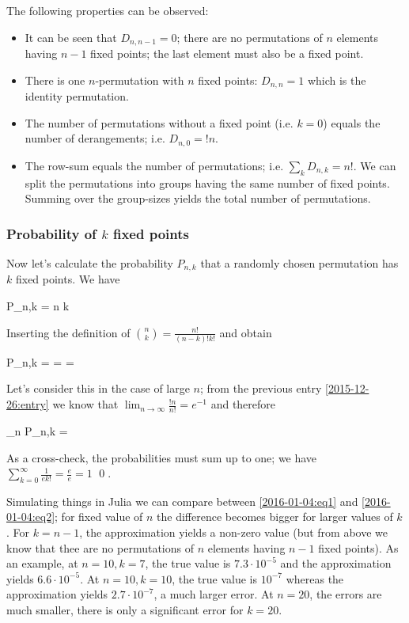 The following properties can be observed:

\begin{itemize}
\item  It can be seen that $D_{n,n-1} = 0$; there are no permutations of $n$ elements having $n-1$ fixed points; the last element must also be a fixed point.
\item  There is one $n$-permutation with $n$ fixed points: $D_{n,n} = 1$ which is the identity permutation.
\item  The number of permutations without a fixed point (i.e. $k=0$) equals the number of derangements; i.e. $D_{n,0} = !n$.
\item  The row-sum equals the number of permutations; i.e. $\sum_{k} D_{n,k} = n!$. We can split the permutations into groups having the same number of fixed points. Summing over the group-sizes yields the total number of permutations.
\end{itemize}

\subsubsection{Probability of $k$ fixed points}

Now let's calculate the probability $P_{n,k}$ that a randomly chosen permutation has $k$ fixed points. We have

\bee
P_{n,k} = {n \choose k} 
\eee

Inserting the definition of ${n \choose k} = \frac{n!}{(n-k)! k!}$ and obtain

\be\label{2016-01-04:eq1}
P_{n,k} =   =  =  
\ee

Let's consider this in the case of large $n$; from the previous entry \ref{2015-12-26:entry} we know that $\lim_{n \rightarrow \infty} \frac{!n}{n!} = e^{-1}$ and therefore

\be\label{2016-01-04:eq2}
\lim_{n \rightarrow \infty} P_{n,k} = 
\ee

As a cross-check, the probabilities must sum up to one; we have $\sum_{k=0}^\infty \frac{1}{e k!} = \frac{e}{e} = 1$ \qed.

Simulating things in Julia we can compare between \eqref{2016-01-04:eq1} and \eqref{2016-01-04:eq2}; for fixed value of $n$ the difference becomes bigger for larger values of $k$. For $k=n-1$, the approximation yields a non-zero value (but from above we know that thee are no permutations of $n$ elements having $n-1$ fixed points). As an example, at $n = 10, k=7$, the true value is $7.3 \cdot 10^{-5}$ and the approximation yields $6.6 \cdot 10^{-5}$. At $n = 10, k=10$, the true value is $10^{-7}$ whereas the approximation yields $2.7 \cdot 10^{-7}$, a much larger error. At $n=20$, the errors are much smaller, there is only a significant error for $k=20$.

